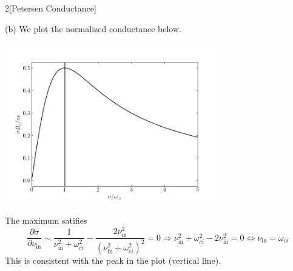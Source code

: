 \documentclass[12pt]{article}
\begin{document}
\begin{problem}{2}[Petersen Conductance]
\begin{solution}
(b) We plot the normalized conductance below.
\begin{center}
    \includegraphics[width=0.7\textwidth]{p2.png}
\end{center}
The maximum satifies
\begin{equation}
    \frac{\partial
    \sigma}{\partial\nu_\text{in}}\sim\frac1{\nu_\text{in}^2+\omega_{ci}^2}-\frac{2\nu_\text{in}^2}{(\nu_\text{in}^2+\omega_{ci}^2)^2}=0 
    \Rightarrow \nu_\text{in}^2+\omega_{ci}^2-2\nu_\text{in}^2=0\Leftrightarrow
    \nu_\text{in}=\omega_{ci}
\end{equation}
This is consistent with the peak in the plot (vertical line).
\end{solution}
\end{problem}
\end{document}
